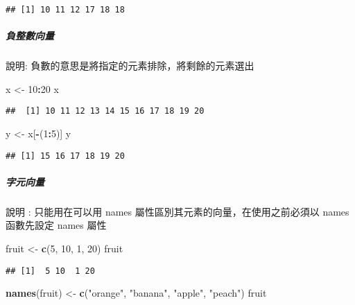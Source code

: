 \documentclass[
]{article}
\newenvironment{Shaded}{\begin{snugshade}}{\end{snugshade}}
\newcommand{\DecValTok}[1]{\textcolor[rgb]{0.00,0.00,0.81}{#1}}
\newcommand{\KeywordTok}[1]{\textcolor[rgb]{0.13,0.29,0.53}{\textbf{#1}}}
\newcommand{\NormalTok}[1]{#1}
\newcommand{\OperatorTok}[1]{\textcolor[rgb]{0.81,0.36,0.00}{\textbf{#1}}}
\newcommand{\StringTok}[1]{\textcolor[rgb]{0.31,0.60,0.02}{#1}}
\begin{document}
\begin{verbatim}
## [1] 10 11 12 17 18 18
\end{verbatim}

\hypertarget{ux8ca0ux6574ux6578ux5411ux91cf}{%
\subparagraph{負整數向量}\label{ux8ca0ux6574ux6578ux5411ux91cf}}

說明: 負數的意思是將指定的元素排除，將剩餘的元素選出

\begin{Shaded}
\begin{Highlighting}[]
\NormalTok{x <-}\StringTok{ }\DecValTok{10}\OperatorTok{:}\DecValTok{20}
\NormalTok{x}
\end{Highlighting}
\end{Shaded}

\begin{verbatim}
##  [1] 10 11 12 13 14 15 16 17 18 19 20
\end{verbatim}

\begin{Shaded}
\begin{Highlighting}[]
\NormalTok{y <-}\StringTok{ }\NormalTok{x[}\OperatorTok{-}\NormalTok{(}\DecValTok{1}\OperatorTok{:}\DecValTok{5}\NormalTok{)]}
\NormalTok{y}
\end{Highlighting}
\end{Shaded}

\begin{verbatim}
## [1] 15 16 17 18 19 20
\end{verbatim}

\hypertarget{ux5b57ux5143ux5411ux91cf}{%
\subparagraph{字元向量}\label{ux5b57ux5143ux5411ux91cf}}

說明 : 只能用在可以用 names 屬性區別其元素的向量，在使用之前必須以 names
函數先設定 names 屬性

\begin{Shaded}
\begin{Highlighting}[]
\NormalTok{fruit <-}\StringTok{ }\KeywordTok{c}\NormalTok{(}\DecValTok{5}\NormalTok{, }\DecValTok{10}\NormalTok{, }\DecValTok{1}\NormalTok{, }\DecValTok{20}\NormalTok{)}
\NormalTok{fruit}
\end{Highlighting}
\end{Shaded}

\begin{verbatim}
## [1]  5 10  1 20
\end{verbatim}

\begin{Shaded}
\begin{Highlighting}[]
\KeywordTok{names}\NormalTok{(fruit) <-}\StringTok{ }\KeywordTok{c}\NormalTok{(}\StringTok{"orange"}\NormalTok{, }\StringTok{"banana"}\NormalTok{, }\StringTok{"apple"}\NormalTok{, }\StringTok{"peach"}\NormalTok{)}
\NormalTok{fruit}
\end{Highlighting}
\end{Shaded}
\end{document}
